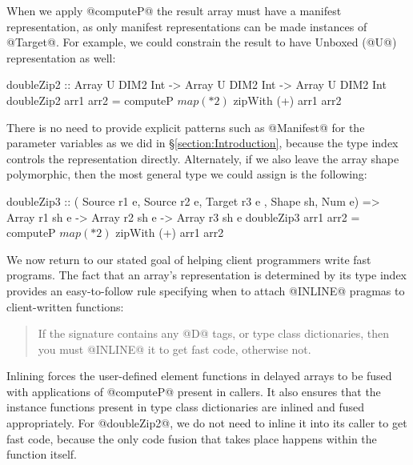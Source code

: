 When we apply @computeP@ the result array must have a manifest representation, as only manifest representations can be made instances of @Target@. For example, we could constrain the result to have Unboxed (@U@) representation as well:
\par
\begin{small}
\begin{code}
  doubleZip2 :: Array U DIM2 Int -> Array U DIM2 Int 
             -> Array U DIM2 Int
  doubleZip2 arr1 arr2
   = computeP $ map (* 2) $ zipWith (+) arr1 arr2
\end{code}
\end{small}
%
There is no need to provide explicit patterns such as @Manifest{}@ for the parameter variables as we did in \S\ref{section:Introduction}, because the type index controls the representation directly. Alternately, if we also leave the array shape polymorphic, then the most general type we could assign is the following:
\par
\begin{small}
\begin{code}
  doubleZip3 :: ( Source r1 e, Source r2 e, Target r3 e
                , Shape sh, Num e)
             => Array r1 sh e -> Array r2 sh e
             -> Array r3 sh e
  doubleZip3 arr1 arr2
   = computeP $ map (* 2) $ zipWith (+) arr1 arr2
\end{code}
\end{small}
%
We now return to our stated goal of helping client programmers write fast programs. The fact that an array's representation is determined by its type index provides an easy-to-follow rule specifying when to attach @INLINE@ pragmas to client-written functions: 
\begin{quote}
If the signature contains any @D@ tags, or type class dictionaries, then you must @INLINE@ it to get fast code, otherwise not.
\end{quote}
Inlining forces the user-defined element functions in delayed arrays to be fused with applications of @computeP@ present in callers. It also ensures that the instance functions present in type class dictionaries are inlined and fused appropriately. For @doubleZip2@, we do not need to inline it into its caller to get fast code, because the only code fusion that takes place happens within the function itself.

